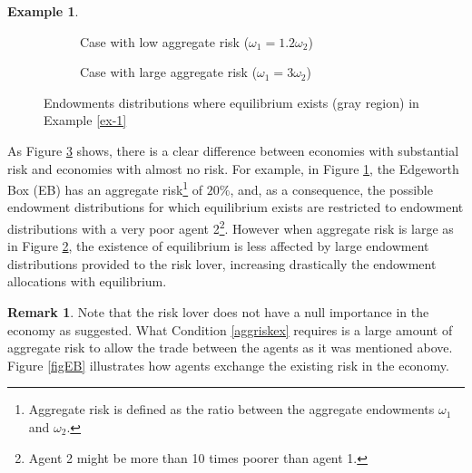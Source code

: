 \documentclass[pdftex]{article}
\numberwithin{equation}{section}
\theoremstyle{th}
\newtheorem{proof lemma}{{Proof Lemma}.}
\theoremstyle{definition}
\newtheorem{example}{Example}%
\newtheorem{remark}{Remark}%
\begin{document}
\begin{example}
\begin{figure}[h]
\begin{center}
\begin{subfigure}[b]{0.3\textwidth}
\caption{Case with low aggregate risk ($\omega_1=1.2\omega_2$)\label{fig1a}}\vspace{-0.37cm}
\end{subfigure}
\hspace{1.0cm}
\begin{subfigure}[b]{0.6\textwidth}
\caption{Case with large aggregate risk ($\omega_1=3\omega_2$)\label{fig1b}}
\end{subfigure}
\end{center}\caption{Endowments distributions where equilibrium exists (gray region) in Example \ref{ex-1} \label{fig1}}
\end{figure}

As Figure \ref{fig1} shows, there is a clear difference between economies with substantial risk and economies with almost no risk. For example, in Figure \ref{fig1a}, the Edgeworth Box (EB) has an aggregate risk\footnote{Aggregate risk is defined as the ratio between the aggregate endowments $\omega_1$ and $\omega_2$.} of $20\%$, and, as a consequence, the possible endowment distributions for which equilibrium exists are restricted to endowment distributions with a very poor agent 2\footnote{Agent 2 might be more than 10 times poorer than agent 1.}. However when aggregate risk is large as in Figure \ref{fig1b}, the existence of equilibrium is less affected by large endowment distributions provided to the risk lover, increasing drastically the endowment allocations with equilibrium.
\begin{remark}
{Note that the risk lover does not have a null importance in the economy as \cite{Aumann2} suggested. What Condition \ref{aggriskex} requires is a large amount of aggregate risk to allow the trade between the agents as it was mentioned above. Figure \ref{figEB} illustrates how agents exchange the existing risk in the economy.}




\end{remark}
\end{example}
\end{document}
